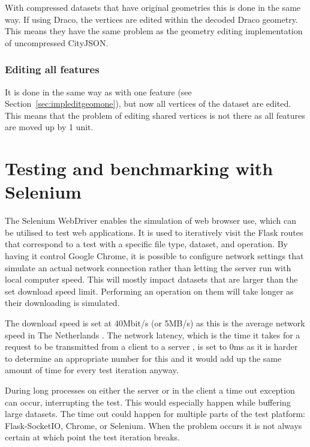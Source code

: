 With compressed datasets that have original geometries this is done in the same way.
If using Draco, the vertices are edited within the decoded Draco geometry.
This means they have the same problem as the geometry editing implementation of uncompressed CityJSON.


\subsubsection{Editing all features}
It is done in the same way as with one feature (see Section~\ref{sec:impleditgeomone}), but now all vertices of the dataset are edited.
This means that the problem of editing shared vertices is not there as all features are moved up by 1 unit.


\section{Testing and benchmarking with Selenium}
\label{implselenium}

The Selenium WebDriver \citep{Selenium2020} enables the simulation of web browser use, which can be utilised to test web applications.
It is used to iteratively visit the Flask routes that correspond to a test with a specific file type, dataset, and operation.
By having it control Google Chrome, it is possible to configure network settings that simulate an actual network connection rather than letting the server run with local computer speed.
This will mostly impact datasets that are larger than the set download speed limit.
Performing an operation on them will take longer as their downloading is simulated.

The download speed is set at 40Mbit/s (or 5MB/s) as this is the average network speed in The Netherlands \citep{Cable2019}.
The network latency, which is the time it takes for a request to be transmitted from a client to a server \citep{KeyCDN2018}, is set to 0ms as it is harder to determine an appropriate number for this and it would add up the same amount of time for every test iteration anyway.

During long processes on either the server or in the client a time out exception can occur, interrupting the test.
This would especially happen while buffering large datasets.
The time out could happen for multiple parts of the test platform: Flask-SocketIO, Chrome, or Selenium.
When the problem occurs it is not always certain at which point the test iteration breaks.

